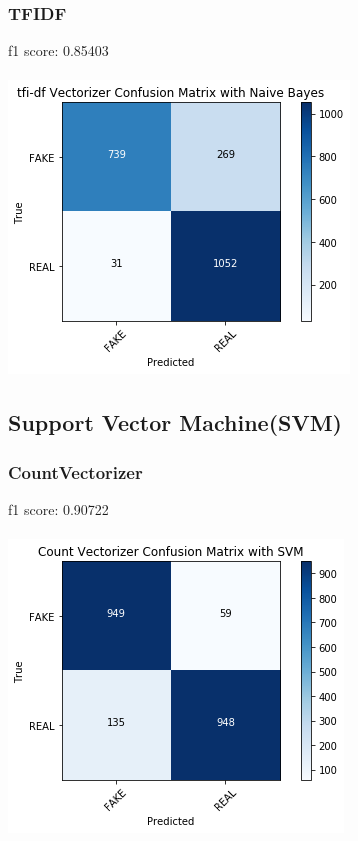 \documentclass[twoside,twocolumn]{article}
\begin{document}
    \subsubsection{TFIDF}
    f1 score: 0.85403\\
    \\ \noindent \includegraphics[scale=0.6]{NBC_tfidf.png}
    
    \subsection{Support Vector Machine(SVM)}
    \subsubsection{CountVectorizer}
    f1 score: 0.90722\\
    \\ \noindent \includegraphics[scale=0.6]{SVM_count.png}
\end{document}
